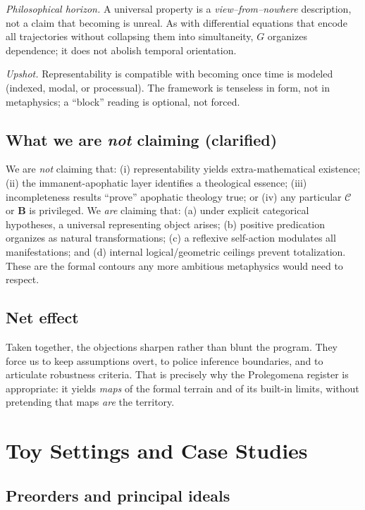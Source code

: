 \documentclass[11pt]{article}
\theoremstyle{upright}
\begin{document}
\smallskip
\emph{Philosophical horizon.} A universal property is a \emph{view–from–nowhere} description, not a claim that becoming is unreal. As with differential equations that encode all trajectories without collapsing them into simultaneity, $G$ organizes dependence; it does not abolish temporal orientation.

\smallskip
\emph{Upshot.} Representability is compatible with becoming once time is modeled (indexed, modal, or processual). The framework is tenseless in form, not in metaphysics; a “block” reading is optional, not forced. 

\subsection{What we are \emph{not} claiming (clarified)}
We are \emph{not} claiming that: (i) representability yields extra-mathematical existence; (ii) the immanent-apophatic layer identifies a theological essence; (iii) incompleteness results \citep{Goedel1931} “prove” apophatic theology true; or (iv) any particular \(\mathcal C\) or \(\mathbf B\) is privileged. We \emph{are} claiming that: (a) under explicit categorical hypotheses, a universal representing object arises; (b) positive predication organizes as natural transformations; (c) a reflexive self-action modulates all manifestations; and (d) internal logical/geometric ceilings prevent totalization. These are the formal contours any more ambitious metaphysics would need to respect.

\subsection{Net effect}
Taken together, the objections sharpen rather than blunt the program. They force us to keep assumptions overt, to police inference boundaries, and to articulate robustness criteria. That is precisely why the Prolegomena register is appropriate: it yields \emph{maps} of the formal terrain and of its built-in limits, without pretending that maps \emph{are} the territory.


\section{Toy Settings and Case Studies}\label{sec:toys}
\subsection{Preorders and principal ideals}\label{subsec:preorders}
\end{document}
